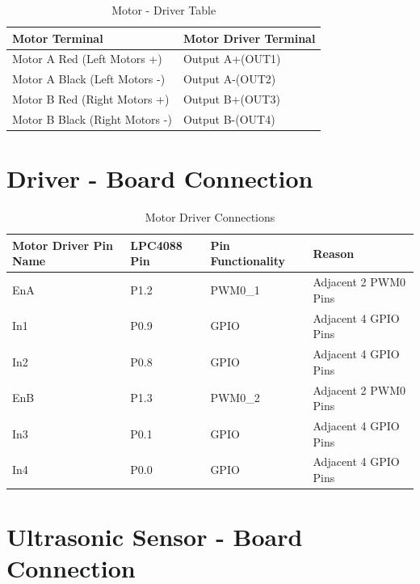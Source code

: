\documentclass[12pt]{article}
\begin{document}
\begin {table}[H]
\begin {center}
\begin{tabular}{|p{7cm}|p{6cm}|} 
\hline 
\textbf{Motor Terminal} & \textbf{Motor Driver Terminal} \\ 
\hline 
 Motor A Red (Left Motors +) & Output A+(OUT1) \\ 
\hline 
 Motor A Black (Left Motors -) & Output A-(OUT2)  \\ 
\hline 
 Motor B Red (Right Motors +) & Output B+(OUT3) \\ 
 \hline 
 Motor B Black (Right Motors -) & Output B-(OUT4) \\ 
\hline 
\end{tabular}
\end {center}
\caption {Motor - Driver Table}
\end {table}

\newpage
\newpage
\section{Driver - Board Connection}

\begin {table}[H]
\begin {center}
\begin{tabular}{|p{3cm}|p{3cm}|p{4cm}|p{3cm}|} 
\hline 
\textbf{Motor Driver Pin Name} & \textbf{LPC4088 Pin} & \textbf{Pin Functionality} & \textbf{Reason} \\ 
\hline 
EnA & P1.2 & PWM0\_1 & Adjacent 2 PWM0 Pins \\ 
\hline 
In1 & P0.9 & GPIO & Adjacent 4 GPIO Pins  \\ 
\hline 
In2 & P0.8 & GPIO & Adjacent 4 GPIO Pins  \\ 
\hline 
EnB & P1.3 & PWM0\_2 & Adjacent 2 PWM0 Pins  \\ 
\hline 
In3 & P0.1 & GPIO & Adjacent 4 GPIO Pins  \\ 
\hline 
In4 & P0.0 & GPIO & Adjacent 4 GPIO Pins  \\ 
\hline
\end{tabular}
\end {center}
\caption {Motor Driver Connections}
\end {table}

\newpage
\newpage

\section{Ultrasonic Sensor - Board Connection}
\end{document}
